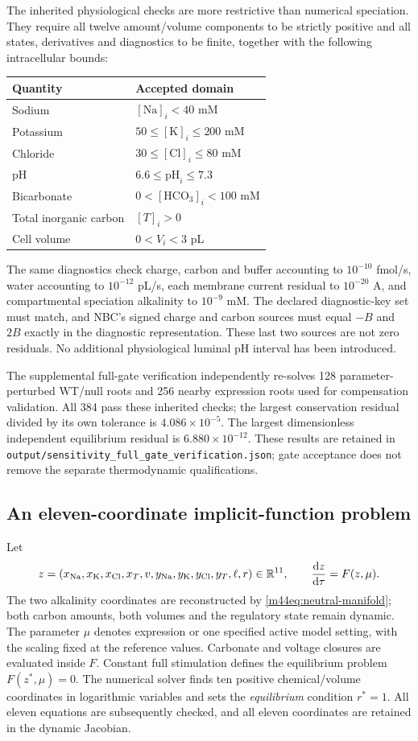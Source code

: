 The inherited physiological checks are more restrictive than numerical
speciation. They require all twelve amount/volume components to be strictly
positive and all states, derivatives and diagnostics to be finite, together
with the following intracellular bounds:
\begin{center}
\begin{tabular}{ll}\hline
Quantity & Accepted domain\\\hline
Sodium & $[\mathrm{Na}]_i<40$ mM\\
Potassium & $50\leq[\mathrm K]_i\leq200$ mM\\
Chloride & $30\leq[\mathrm{Cl}]_i\leq80$ mM\\
pH & $6.6\leq\mathrm{pH}_i\leq7.3$\\
Bicarbonate & $0<[\mathrm{HCO}_3]_i<100$ mM\\
Total inorganic carbon & $[T]_i>0$\\
Cell volume & $0<V_i<3$ pL\\\hline
\end{tabular}
\end{center}
The same diagnostics check charge, carbon and buffer accounting to
$10^{-10}$ fmol/s, water accounting to $10^{-12}$ pL/s, each membrane
current residual to $10^{-20}$ A, and compartmental speciation alkalinity
to $10^{-9}$ mM. The declared diagnostic-key set must match, and NBC's
signed charge and carbon sources must equal $-B$ and $2B$ exactly in the
diagnostic representation. These last two sources are not zero residuals.
No additional physiological luminal pH interval has been introduced.

The supplemental full-gate verification independently re-solves 128
parameter-perturbed WT/null roots and 256 nearby expression roots used for
compensation validation. All 384 pass these inherited checks; the largest
conservation residual divided by its own tolerance is $4.086\times10^{-5}$.
The largest dimensionless independent equilibrium residual is
$6.880\times10^{-12}$. These results are retained in
\texttt{output/sensitivity\_full\_gate\_verification.json}; gate acceptance
does not remove the separate thermodynamic qualifications.

\subsection{An eleven-coordinate implicit-function problem}
Let
\[
 z=(x_{\rm Na},x_{\rm K},x_{\rm Cl},x_T,v,
       y_{\rm Na},y_{\rm K},y_{\rm Cl},y_T,\ell,r)\in\mathbb R^{11},
 \qquad \frac{\mathrm dz}{\mathrm d\tau}=F(z,\mu).
\]
The two alkalinity coordinates are reconstructed by
\eqref{m44eq:neutral-manifold}; both carbon amounts, both volumes and the
regulatory state remain dynamic. The parameter $\mu$ denotes expression
or one specified active model setting, with the scaling fixed at the
reference values. Carbonate and voltage closures are evaluated inside $F$.
Constant full stimulation defines the equilibrium problem $F(z^*,\mu)=0$.
The numerical solver finds ten positive chemical/volume coordinates in
logarithmic variables and sets the \emph{equilibrium} condition $r^*=1$.
All eleven equations are subsequently checked, and all eleven coordinates
are retained in the dynamic Jacobian.

